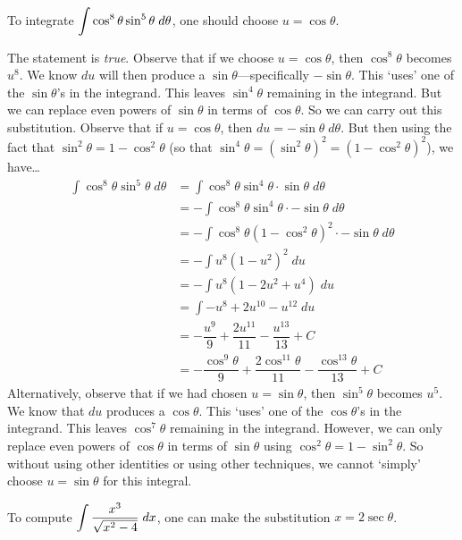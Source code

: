 \documentclass[11pt,letterpaper]{article}
\begin{document}
 To integrate $\displaystyle\int \cos^8 \theta \sin^5 \theta \;d\theta$, one should choose $u= \cos \theta$. \pspace

\sol The statement is \textit{true}. Observe that if we choose $u= \cos \theta$, then $\cos^8 \theta$ becomes $u^8$. We know $du$ will then produce a $\sin \theta$---specifically $-\sin \theta$. This `uses' one of the $\sin \theta$'s in the integrand. This leaves $\sin^4 \theta$ remaining in the integrand. But we can replace even powers of $\sin \theta$ in terms of $\cos \theta$. So we can carry out this substitution. Observe that if $u= \cos \theta$, then $du= -\sin \theta \;d\theta$. But then using the fact that $\sin^2 \theta= 1 - \cos^2 \theta$ (so that $\sin^4 \theta= (\sin^2 \theta)^2= (1 - \cos^2 \theta)^2$), we have\dots
	\[
	\begin{aligned}
	\int \cos^8 \theta \sin^5 \theta \;d\theta&= \int \cos^8 \theta \sin^4 \theta \cdot \sin \theta \; d\theta \\
	&= -\int \cos^8 \theta \sin^4 \theta \cdot -\sin \theta \; d\theta \\
	&= -\int \cos^8 \theta (1 - \cos^2 \theta)^2 \cdot -\sin \theta \;d\theta \\
	&= -\int u^8 (1 - u^2)^2 \;du \\
	&= -\int u^8 (1 - 2u^2 + u^4) \;du \\
	&= \int -u^8 + 2u^{10} - u^{12} \;du \\
	&= -\dfrac{u^9}{9} + \dfrac{2u^{11}}{11} - \dfrac{u^{13}}{13} + C \\
	&= -\dfrac{\cos^9 \theta}{9} + \dfrac{2\cos^{11} \theta}{11} - \dfrac{\cos^{13} \theta}{13} + C
	\end{aligned}
	\]
Alternatively, observe that if we had chosen $u= \sin \theta$, then $\sin^5 \theta$ becomes $u^5$. We know that $du$ produces a $\cos \theta$. This `uses' one of the $\cos \theta$'s in the integrand. This leaves $\cos^7 \theta$ remaining in the integrand. However, we can only replace even powers of $\cos \theta$ in terms of $\sin \theta$ using $\cos^2 \theta= 1 - \sin^2 \theta$. So without using other identities or using other techniques, we cannot `simply' choose $u= \sin \theta$ for this integral. \pvspace{1.3cm}



 To compute $\displaystyle\int \dfrac{x^3}{\sqrt{x^2 - 4}} \;dx$, one can make the substitution $x= 2 \sec \theta$. \pspace
\end{document}

